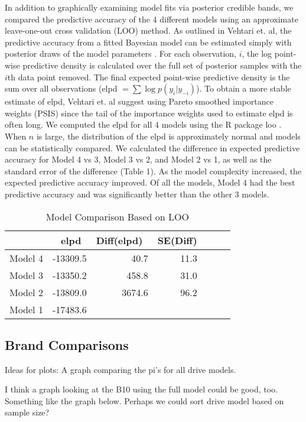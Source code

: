 \documentclass[12pt]{article}
\begin{document}
In addition to graphically examining model fits via posterior credible bands, we compared the predictive accuracy of the 4 different models using an approximate leave-one-out cross validation (LOO) method.  As outlined in Vehtari et. al, the predictive accuracy from a fitted Bayesian model can be estimated simply with posterior draws of the model parameters \citet{vehtari}.  For each observation, $i$, the log point-wise predictive density is calculated over the full set of posterior samples with the $i$th data point removed.  The final expected point-wise predictive density is the sum over all observations (elpd $=\sum{\log p(y_i|y_{-i})}$).  To obtain a more stable estimate of elpd, Vehtari et. al suggest using Pareto smoothed importance weights (PSIS) since the tail of the importance weights used to estimate elpd is often long.  We computed the elpd for all 4 models using the R package loo \citet{loo}.  When $n$ is large, the distribution of the elpd is approximately normal and models can be statistically compared.  We calculated the difference in expected predictive accuracy for Model 4 vs 3, Model 3 vs 2, and Model 2 vs 1, as well as the standard error of the difference (Table 1).  As the model complexity increased, the expected predictive accuracy improved.  Of all the models, Model 4 had the best predictive accuracy and was significantly better than the other 3 models.

\begin{table}[H]
\centering
\begin{tabular}{rrrrrrr}
  \hline
 & elpd\ & Diff(elpd)\ & SE(Diff) \\ 
  \hline
Model 4 & -13309.5 & 40.7 & 11.3 \\ 
Model 3 & -13350.2 & 458.8 & 31.0  \\ 
Model 2 & -13809.0 & 3674.6 & 96.2 \\ 
Model 1 & -17483.6  \\ 
   \hline
\end{tabular}
\caption{Model Comparison Based on LOO}
\label{table:1}
\end{table}


\subsection{Brand Comparisons}
Ideas for plots: A graph comparing the pi's for all drive models.

I think a graph looking at the B10 using the full model could be good, too.  Something like the graph below.  Perhaps we could sort drive model based on sample size?
\end{document}
